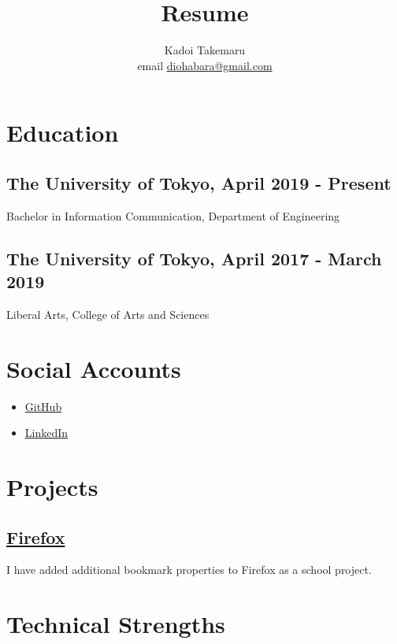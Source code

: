 \documentclass{article}
\title{Resume}
\author{Kadoi Takemaru \\ email \href{mailto:diohabara@gmail.com}{diohabara@gmail.com}}
\begin{document}
\maketitle

\section*{Education}
  \subsection*{The University of Tokyo, April 2019 - Present}
    Bachelor in Information Communication, Department of Engineering
  \subsection*{The University of Tokyo, April 2017 - March 2019}
    Liberal Arts, College of Arts and Sciences

\section*{Social Accounts}
  \begin{itemize}
    \item \href{https://github.com/diohabara/}{GitHub}
    \item \href{https://www.linkedin.com/in/takemaru-kadoi-6950b5172/}{LinkedIn}
  \end{itemize}

\section*{Projects}
  \subsection*{\href{https://slides.com/diohabara/deck}{Firefox}}
    I have added additional bookmark properties to Firefox as a school project.


\section*{Technical Strengths}
\end{document}
